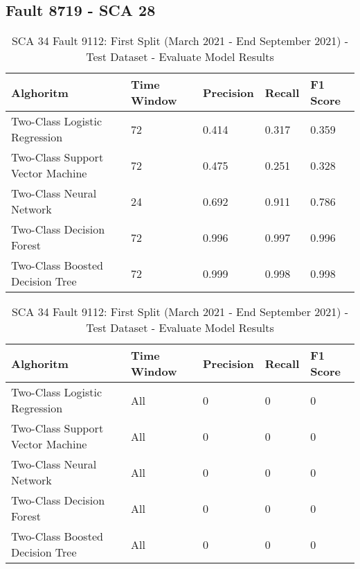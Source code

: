 \subsection{Fault 8719 - SCA 28}

\begin{table}[!ht]
    \centering
    \begin{tabular}{|l|l|l|l|l|}
    \hline
        Alghoritm & Time Window & Precision & Recall & F1 Score \\ \hline
        Two-Class Logistic Regression & 72 & 0.414 & 0.317 & 0.359 \\ \hline
        Two-Class Support Vector Machine & 72 & 0.475 & 0.251 & 0.328 \\ \hline
        Two-Class Neural Network & 24 & 0.692 & 0.911 & 0.786 \\ \hline
        Two-Class Decision Forest & 72 & 0.996 & 0.997 & 0.996 \\ \hline
        Two-Class Boosted Decision Tree & 72 & 0.999 & 0.998 & 0.998 \\ \hline
    \end{tabular}
    \caption{SCA 34 Fault 9112: First Split (March 2021 - End September 2021) - Test Dataset - Evaluate Model Results}
    \label{9112_SCA34_1st}
\end{table}

\begin{table}[!ht]
    \centering
    \begin{tabular}{|l|l|l|l|l|}
    \hline
        Alghoritm & Time Window & Precision & Recall & F1 Score \\ \hline
        Two-Class Logistic Regression & All & 0 & 0 & 0 \\ \hline
        Two-Class Support Vector Machine & All & 0 & 0 & 0 \\ \hline
        Two-Class Neural Network & All & 0 & 0 & 0 \\ \hline
        Two-Class Decision Forest & All & 0 & 0 & 0 \\ \hline
        Two-Class Boosted Decision Tree & All & 0 & 0 & 0 \\ \hline
    \end{tabular}
    \caption{SCA 34 Fault 9112: First Split (March 2021 - End September 2021) - Test Dataset - Evaluate Model Results}
    \label{9112_SCA34_1st}
\end{table}

